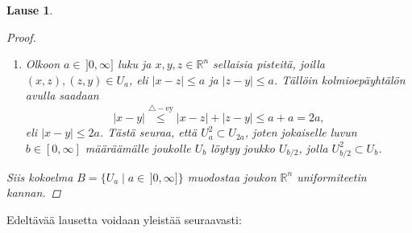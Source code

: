 \documentclass[12pt,a4paper,leqno]{report}
\newcommand{\R}{\mathbb{R}}
\theoremstyle{plain}
\newtheorem{lause}[equation]{Lause}
\theoremstyle{definition}
\theoremstyle{remark}
\begin{document}
\begin{lause}
\begin{proof}
\begin{enumerate} [label=(B\arabic*)]
\begin{align*}
\end{align*}
Siis jokaiselle $U_a$ pätee $U_a\subset  U_a^{-1}. $
\item%
Olkoon $a\in\,]0,\infty]$ luku ja $x,y,z\in\R^n$ sellaisia pisteitä, 
joilla $(x,z),(z,y)\in U_a$, 
eli $|x-z|\leq a$ ja $|z-y|\leq a$.
Tällöin kolmioepäyhtälön avulla saadaan 
$$|x-y|\stackrel{\triangle-\text{ey} }{\leq} |x-z|+|z-y|\leq a+a=2a,$$ 
eli $|x-y|\leq 2a$. Tästä seuraa, että $ U_a^2\subset U_{2a} $, joten jokaiselle luvun $b\in[0,\infty]$ määräämälle joukolle $U_b$ löytyy joukko $U_{b/2}$, jolla $U_{b/2}^2\subset U_b$.
\end{enumerate}
Siis kokoelma $B=\{U_a\mid a\in\,]0,\infty]\}$ muodostaa joukon $\R^n$ uniformiteetin kannan.
\end{proof}
\end{lause}
\noindent Edeltävää lausetta voidaan yleistää seuraavasti: 
\end{document}
